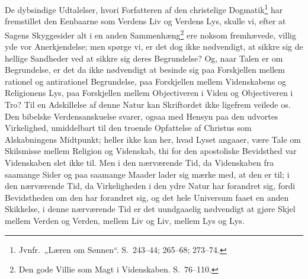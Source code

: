 \documentclass[12pt]{book}
\begin{document}
De dybsindige Udtalelser, hvori Forfatteren af den christelige
Dogmatik\footnote{Jvnfr.\ „Læren om Sønnen“. S.\ 243--44;
265--68; 273--74.} har fremstillet den Eenbaarne som Verdens Liv og
Verdens Lys, skulle vi, efter at Sagens Skyggesider alt i en anden
Sammenhæng\footnote{Den gode Villie som Magt i Videnskaben.
S.\ 76--110.} ere noksom fremhævede, villig yde vor Anerkjendelse;
men spørge vi, er det dog ikke nødvendigt, at sikkre sig de hellige
Sandheder ved at sikkre sig deres Begrundelse? Og, naar Talen er om
Begrundelse, er det da ikke nødvendigt at besinde sig paa
Forskjellen mellem rationel og antirationel Begrundelse, paa
Forskjellen mellem Videnskabens og Religionens Lys, paa Forskjellen
mellem Objectiveren i Viden og Objectiveren i Tro? Til en
Adskillelse af denne Natur kan Skriftordet ikke ligefrem veilede os.
Den bibelske Verdensanskuelse svarer, ogsaa med Hensyn paa den
udvortes Virkelighed, umiddelbart til den troende Opfattelse af
Christus som Alskabningens Midtpunkt; heller ikke kan her, hvad
Lyset angaaer, være Tale om Skilsmisse mellem Religion og Videnskab,
thi for den apostoliske Bevidsthed var Videnskaben slet ikke til.
Men i den nærværende Tid, da Videnskaben fra saamange Sider og paa
saamange Maader lader sig mærke
med, at den er til; i den nærværende Tid, da Virkeligheden i den
ydre Natur har forandret sig, fordi Bevidstheden om den har
forandret sig, og det hele Universum faaet en anden Skikkelse, i
denne nærværende Tid er det uundgaaelig nødvendigt at gjøre Skjel
mellem Verden og Verden, mellem Liv og Liv, mellem Lys og Lys.
\end{document}
